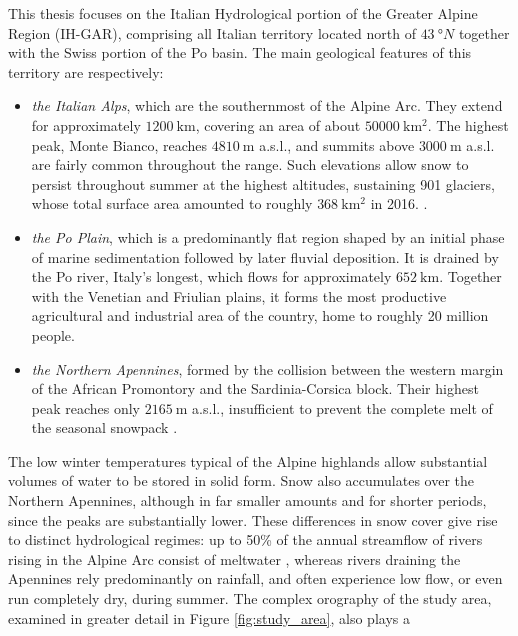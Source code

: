 This thesis focuses on the Italian Hydrological portion of the Greater Alpine Region (IH-GAR), comprising all Italian territory located north of $\SI{43}{\degree N}$ 
together with the Swiss portion of the Po basin. The main geological features of this territory are respectively: 
\begin{itemize}[label=$\blacktriangleright$]
    \item \textit{the Italian Alps}, which are the southernmost of the Alpine Arc. They extend for approximately $\SI{1200}{\kilo\meter}$, covering an 
    area of about $\SI{50000}{\kilo\meter\squared}$. The highest peak, Monte Bianco, reaches $\SI{4810}{\meter}$ a.s.l., and summits above 
    $\SI{3000}{\meter}$ a.s.l. are  fairly common throughout the range. Such elevations allow snow to persist throughout summer at the highest altitudes, 
    sustaining 901 glaciers, whose total surface area amounted to roughly $\SI{368}{\kilo\meter\squared}$ in \num{2016}. \parencite{catasto_ghiacciai}.
    \item \textit{the Po Plain}, which is a predominantly flat region shaped by an initial phase of marine sedimentation followed by later fluvial deposition. 
    It is drained by the Po river, Italy's longest, which flows for approximately $\SI{652}{\kilo\meter}$. Together with the Venetian and Friulian plains, 
    it forms the most productive agricultural and industrial area of the country, home to roughly 20 million people.
    \item \textit{the Northern Apennines}, formed by the collision between the western margin of the African Promontory and the Sardinia-Corsica block. 
    Their highest peak reaches only $\SI{2165}{\meter}$ a.s.l., insufficient to prevent the complete melt of the seasonal snowpack
    \parencite{libro_geografia_IHGAR}. 
\end{itemize}
The low winter temperatures typical of the Alpine highlands allow substantial volumes of water to be stored in solid form. Snow also 
accumulates over the Northern Apennines, although in far smaller amounts and for shorter periods, since the peaks are substantially lower. These 
differences in snow cover give rise to distinct hydrological regimes: up to 50\% of the annual streamflow of rivers rising in the Alpine Arc consist 
of meltwater \parencite{snow_drought}, whereas rivers draining the Apennines rely predominantly on rainfall, and often experience low flow, or even run 
completely dry, during summer. The complex orography of the study area, examined in greater detail in Figure \ref{fig:study_area}, also plays a 
